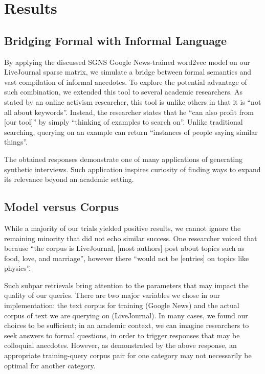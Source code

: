 \documentclass{sigchi}
\begin{document}
\section{Results}



\subsection{Bridging Formal with Informal Language}
By applying the discussed SGNS Google News-trained word2vec model on our LiveJournal sparse matrix, we simulate a bridge between formal semantics and vast compilation of informal anecdotes. To explore the potential advantage of such combination, we extended this tool to several academic researchers. As stated by an online activism researcher, this tool is unlike others in that it is ``not all about keywords''. Instead, the researcher states that he ``can also profit from [our tool]'' by simply ``thinking of examples to search on''. Unlike traditional searching, querying on an example can return ``instances of people saying similar things''. 

The obtained responses demonstrate one of many applications of generating synthetic interviews. Such application inspires curiosity of finding ways to expand its relevance beyond an academic setting. 

\subsection{Model versus Corpus}
While a majority of our trials yielded positive results, we cannot ignore the remaining minority that did not echo similar success. One researcher voiced that because ``the corpus is LiveJournal, [most authors] post about topics such as food, love, and marriage'', however there ``would not be [entries] on topics like physics''. 

Such subpar retrievals bring attention to the parameters that may impact the quality of our queries. There are two major variables we chose in our implementation: the text corpus for training (Google News) and the actual corpus of text we are querying on (LiveJournal). In many cases, we found our choices to be sufficient; in an academic context, we can imagine researchers to seek answers to formal questions, in order to trigger responses that may be colloquial anecdotes. However, as demonstrated by the above response, an appropriate training-query corpus pair for one category may not necessarily be optimal for another category.
\end{document}
